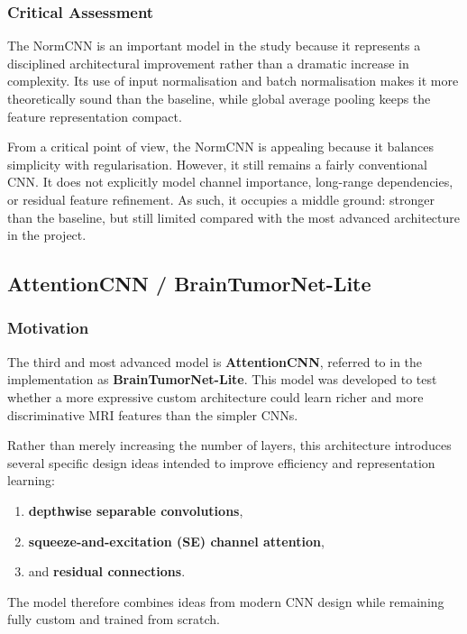 \documentclass{article}
\begin{document}
\subsubsection{Critical Assessment}

The NormCNN is an important model in the study because it represents a disciplined architectural improvement rather than a dramatic increase in complexity. Its use of input normalisation and batch normalisation makes it more theoretically sound than the baseline, while global average pooling keeps the feature representation compact.

From a critical point of view, the NormCNN is appealing because it balances simplicity with regularisation. However, it still remains a fairly conventional CNN. It does not explicitly model channel importance, long-range dependencies, or residual feature refinement. As such, it occupies a middle ground: stronger than the baseline, but still limited compared with the most advanced architecture in the project.

\subsection{AttentionCNN / BrainTumorNet-Lite}

\subsubsection{Motivation}

The third and most advanced model is \textbf{AttentionCNN}, referred to in the implementation as \textbf{BrainTumorNet-Lite}. This model was developed to test whether a more expressive custom architecture could learn richer and more discriminative MRI features than the simpler CNNs.

Rather than merely increasing the number of layers, this architecture introduces several specific design ideas intended to improve efficiency and representation learning:
\begin{enumerate}
    \item \textbf{depthwise separable convolutions},
    \item \textbf{squeeze-and-excitation (SE) channel attention},
    \item and \textbf{residual connections}.
\end{enumerate}

The model therefore combines ideas from modern CNN design while remaining fully custom and trained from scratch.
\end{document}
